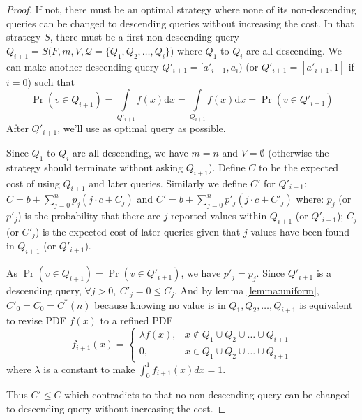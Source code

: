 \begin{proof}

If not, there must be an optimal strategy where none of its
non-descending queries can be changed to descending queries without increasing
the cost. In that strategy $S$, there must be a first non-descending query
$Q_{i+1} = S\big(F, m, V, \mathcal Q = \{Q_1, Q_2, \ldots, Q_i\}\big)$ where
$Q_1$ to $Q_i$ are all descending.  We can make another descending query
$Q'_{i+1} = [a'_{i+1}, a_i)$ (or $Q'_{i+1} = [a'_{i+1}, 1]$ if $i = 0$) such
that
\[
\Pr(v \in Q_{i+1}) = \int \limits_{Q'_{i+1}} f(x) \mathrm d x = \int \limits_{Q_{i+1}} f(x) \mathrm d x = \Pr(v \in Q'_{i+1})
\]
After $Q'_{i+1}$, we'll use as optimal query as
possible.

Since $Q_1$ to $Q_i$ are all descending, we have $m = n$ and $V = \emptyset$ (otherwise
the strategy should terminate without asking $Q_{i+1}$).
Define $C$ to be the expected cost of using $Q_{i+1}$ and later queries. Similarly we define $C'$ for $Q'_{i+1}$:\\
$
C = b + \sum_{j=0}^n p_j ( j \cdot c + C_j)
$
and
$
C' = b + \sum_{j=0}^n p'_j ( j \cdot c + C'_j)
$
where:
$p_j$ (or $p'_j$) is the probability that there are $j$ reported values within $Q_{i+1}$ (or $Q'_{i+1}$);
$C_j$ (or $C'_j$) is the expected cost of later queries given that $j$ values have been
found in $Q_{i+1}$ (or $Q'_{i+1}$).

As $\Pr(v \in Q_{i+1}) = \Pr(v \in Q'_{i+1})$, we have $p'_j = p_j$. Since $Q'_{i+1}$ is a
descending query, $\forall j > 0, ~C'_j = 0 \leq C_j$. And by lemma \ref{lemma:uniform},
$C'_0 = C_0 = C^*(n)$ because knowing no value is in $Q_1, Q_2, \ldots, Q_{i+1}$ is equivalent
to revise PDF $f(x)$ to a refined PDF 
\[
f_{i+1}(x) = \begin{cases}
	\lambda f(x), & x \notin Q_1 \cup Q_2 \cup \ldots \cup Q_{i+1} \\
	0, & x \in Q_1 \cup Q_2 \cup \ldots \cup Q_{i+1}
\end{cases}
\]
where $\lambda$ is a constant to make $\int_0^1 f_{i+1}(x) dx = 1$.

Thus $C' \leq C$ which contradicts to that no non-descending query can be changed to
descending query without increasing the cost.

\end{proof}


